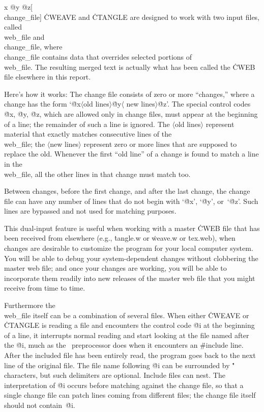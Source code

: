 \@{x @y @z}[\\{change\_file}]
\.{CWEAVE} and \.{CTANGLE} are designed to work with two input files,
called \\{web\_file} and \\{change\_file}, where \\{change\_file} contains
data that overrides selected portions of \\{web\_file}. The resulting merged
text is actually what has been called the \.{CWEB} file elsewhere in this
report.

\more Here's how it works: The change file consists of zero or more ``changes,''
where a change has the form `\.{@x}$\langle$old lines$\rangle$\.{@y}$\langle$%
new lines$\rangle$\.{@z}'. The special control codes \.{@x}, \.{@y}, \.{@z},
which are allowed only in change files, must appear at the beginning of a line;
the remainder of such a line is ignored.
The $\langle$old lines$\rangle$ represent material that exactly matches
consecutive lines of the \\{web\_file}; the $\langle$new lines$\rangle$
represent zero or more lines that are supposed to replace the old. Whenever
the first ``old line'' of a change is found to match a line in the
\\{web\_file}, all the other lines in that change must match too.

\more Between changes, before the first change, and after the last change,
the change file can have any number of lines that do not begin with
`\.{@x}', `\.{@y}', or~`\.{@z}'. Such lines are bypassed and not used for
matching purposes.

\more This dual-input feature is useful when working with a master \.{CWEB} file
that has been received from elsewhere (e.g., \.{tangle.w} or
\.{weave.w} or \.{tex.web}), when changes are desirable to customize the
program for your local computer system. You will be able to debug your
system-dependent changes without clobbering the master web file; and once
your changes are working, you will be able to incorporate them readily
into new releases of the master web file that you might receive from time
to time.

 Furthermore the \\{web\_file} itself can be a
combination of several files.  When either \.{CWEAVE} or \.{CTANGLE} is
reading a file and encounters the control code \.{@i} at the beginning of a
line, it interrupts normal reading and start looking at the file named after
the \.{@i}, much as the \Cee\ preprocessor does when it encounters an
\.{\#include} line.  After the included file has been entirely read, the
program goes back to the next line of the original file.  The file name
following \.{@i} can be surrounded by \." characters, but such delimiters are
optional. Include files can nest. The interpretation of \.{@i} occurs before
matching against the change file, so that a single change file can patch
lines coming from different files; the change file itself should not
contain~\.{@i}.

